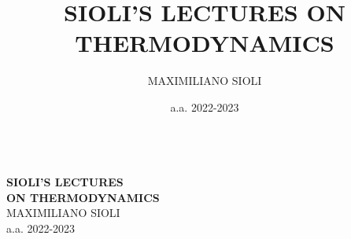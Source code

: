 \documentclass[10pt, oneside]{book}
\title{SIOLI'S LECTURES ON THERMODYNAMICS}
\author{MAXIMILIANO SIOLI}
\date{a.a. 2022-2023}
\begin{document}
\makeatletter
\begin{titlepage}
\vspace{-2.1cm}
\hspace{0cm}
\vfill
\, \\\larger[20]\textsf{\textbf{SIOLI'S LECTURES \\ON THERMODYNAMICS}}
\\\smaller[2]MAXIMILIANO SIOLI
\\a.a. 2022-2023
\\~\\ \larger[20]\,\,
\\~\\ \,\,

\vfill
\hspace{0cm}
\end{titlepage}
\makeatother

\tableofcontents
\newpage
\end{document}
